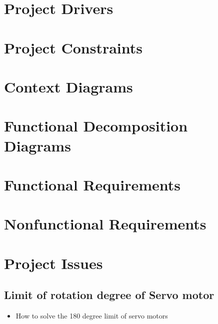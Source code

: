 \documentclass{article}
\begin{document}
\begin{large}
\section{Project Drivers}




\section{Project Constraints}





\section{Context Diagrams}







\section{Functional Decomposition Diagrams}







\section{Functional Requirements}

  



\section{Nonfunctional Requirements}






\section{Project Issues}
\subsection{Limit of rotation degree of Servo motor}
\begin{itemize}
\item{How to solve the 180 degree limit of servo motors}
\end{itemize}


\end{large}
\end{document}
